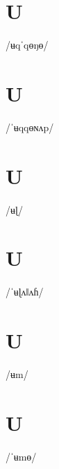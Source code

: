 \documentclass[10pt,a4paper,twoside]{book}
\begin{document}
\section*{U}

\begin{multicols}{3}
 {/ʉqˈqɵŋɵ/} {}
\end{multicols}

\section*{U}

\begin{multicols}{3}
 {/ˈʉqqɵɴʌp/} {}
\end{multicols}

\section*{U}

\begin{multicols}{3}
 {/ʉɭ/} {}
\end{multicols}

\section*{U}

\begin{multicols}{3}
 {/ˈʉɭʌǁʌɦ/} {}
\end{multicols}

\section*{U}

\begin{multicols}{3}
 {/ʉm/} {}
\end{multicols}

\section*{U}

\begin{multicols}{3}
 {/ˈʉmɵ/} {}
\end{multicols}
\end{document}
